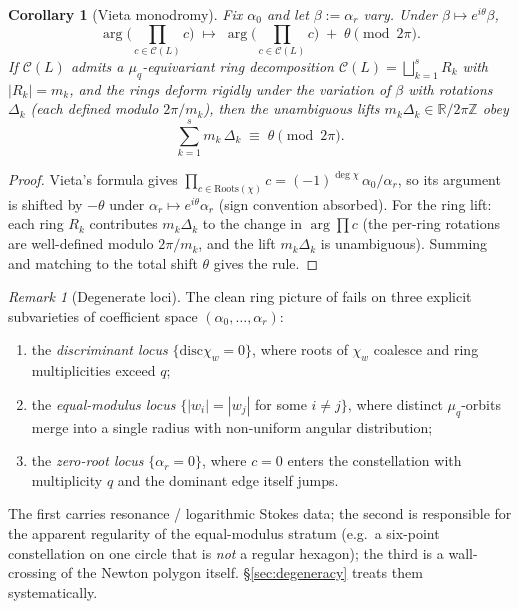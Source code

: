 \documentclass[aip,jmp,preprint,amsmath,amssymb,nofootinbib,floatfix]{revtex4-2}
\theoremstyle{plain}
\newtheorem{corollary}[theorem]{Corollary}
\theoremstyle{definition}
\theoremstyle{remark}
\newtheorem{remark}[theorem]{Remark}
\newcommand{\Roots}{\mathrm{Roots}}
\newcommand{\Cl}{\mathcal{C}}
\newcommand{\disc}{\mathrm{disc}}
\DeclareMathOperator{\arginline}{arg}
\begin{document}
\begin{corollary}[Vieta monodromy]\label{cor:vieta}
Fix $\alpha_0$ and let $\beta := \alpha_r$ vary. Under $\beta \mapsto
e^{i\theta} \beta$,
\[
   \arginline\!\Big(\prod_{c \in \Cl(L)} c\Big)
   \;\longmapsto\;
   \arginline\!\Big(\prod_{c \in \Cl(L)} c\Big) \;+\; \theta \pmod{2\pi}.
\]
If $\Cl(L)$ admits a $\mu_q$-equivariant ring decomposition
$\Cl(L) = \bigsqcup_{k=1}^{s} R_k$ with $|R_k| = m_k$, and the rings deform
rigidly under the variation of $\beta$ with rotations $\Delta_k$ (each
defined modulo $2\pi / m_k$), then the unambiguous lifts $m_k \Delta_k \in
\mathbb{R}/2\pi\mathbb{Z}$ obey
\[
   \sum_{k=1}^{s} m_k\, \Delta_k \;\equiv\; \theta \pmod{2\pi}.
\]
\end{corollary}

\begin{proof}
Vieta's formula gives $\prod_{c \in \Roots(\chi)} c = (-1)^{\deg \chi}\,
\alpha_0 / \alpha_r$, so its argument is shifted by $-\theta$ under
$\alpha_r \mapsto e^{i\theta} \alpha_r$ (sign convention absorbed). For the
ring lift: each ring $R_k$ contributes $m_k \Delta_k$ to the change in
$\arginline \prod c$ (the per-ring rotations are well-defined modulo
$2\pi/m_k$, and the lift $m_k \Delta_k$ is unambiguous). Summing and
matching to the total shift $\theta$ gives the rule.
\end{proof}

\begin{remark}[Degenerate loci]\label{rem:degenerate}
The clean ring picture of  fails on three explicit
subvarieties of coefficient space $(\alpha_0, \dots, \alpha_r)$:
\begin{enumerate}[label=(\roman*)]
\item the \emph{discriminant locus} $\{\disc \chi_w = 0\}$, where roots of
      $\chi_w$ coalesce and ring multiplicities exceed $q$;
\item the \emph{equal-modulus locus} $\{|w_i| = |w_j|$ for some $i \ne j\}$,
      where distinct $\mu_q$-orbits merge into a single radius with
      non-uniform angular distribution;
\item the \emph{zero-root locus} $\{\alpha_r = 0\}$, where $c = 0$ enters
      the constellation with multiplicity $q$ and the dominant edge itself
      jumps.
\end{enumerate}
The first carries resonance / logarithmic Stokes data; the second is
responsible for the apparent regularity of the
equal-modulus stratum (e.g.\ a six-point constellation on one circle
that is \emph{not} a regular hexagon); the third is a wall-crossing of
the Newton
polygon itself. \S\ref{sec:degeneracy} treats them systematically.
\end{remark}
\end{document}
